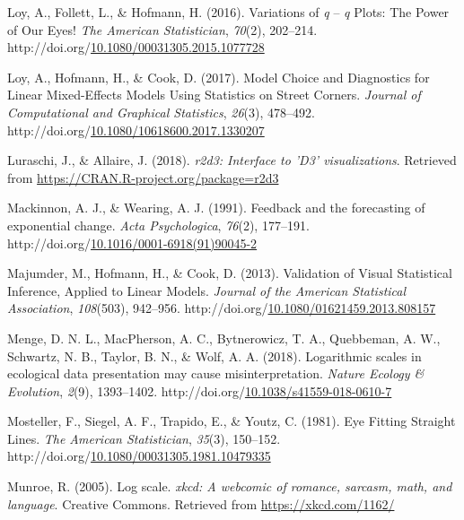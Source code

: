 \documentclass[print]{nuthesis}
\newlength{\cslhangindent}
\newenvironment{CSLReferences}%
{\setlength{\parindent}{0pt}%
\everypar{\setlength{\hangindent}{\cslhangindent}}\ignorespaces}%
{\par}
\begin{document}
\begin{CSLReferences}{1}{0}
\leavevmode\hypertarget{ref-loy_variations_2016}{}%
Loy, A., Follett, L., \& Hofmann, H. (2016). Variations of \emph{q} -- \emph{q} {Plots}: {The} {Power} of {Our} {Eyes}! \emph{The American Statistician}, \emph{70}(2), 202--214. http://doi.org/\href{https://doi.org/10.1080/00031305.2015.1077728}{10.1080/00031305.2015.1077728}

\leavevmode\hypertarget{ref-loy_model_2017}{}%
Loy, A., Hofmann, H., \& Cook, D. (2017). Model {Choice} and {Diagnostics} for {Linear} {Mixed}-{Effects} {Models} {Using} {Statistics} on {Street} {Corners}. \emph{Journal of Computational and Graphical Statistics}, \emph{26}(3), 478--492. http://doi.org/\href{https://doi.org/10.1080/10618600.2017.1330207}{10.1080/10618600.2017.1330207}

\leavevmode\hypertarget{ref-r2d3}{}%
Luraschi, J., \& Allaire, J. (2018). \emph{r2d3: Interface to 'D3' visualizations}. Retrieved from \url{https://CRAN.R-project.org/package=r2d3}

\leavevmode\hypertarget{ref-mackinnon_feedback_1991}{}%
Mackinnon, A. J., \& Wearing, A. J. (1991). Feedback and the forecasting of exponential change. \emph{Acta Psychologica}, \emph{76}(2), 177--191. http://doi.org/\href{https://doi.org/10.1016/0001-6918(91)90045-2}{10.1016/0001-6918(91)90045-2}

\leavevmode\hypertarget{ref-majumder_validation_2013}{}%
Majumder, M., Hofmann, H., \& Cook, D. (2013). Validation of {Visual} {Statistical} {Inference}, {Applied} to {Linear} {Models}. \emph{Journal of the American Statistical Association}, \emph{108}(503), 942--956. http://doi.org/\href{https://doi.org/10.1080/01621459.2013.808157}{10.1080/01621459.2013.808157}

\leavevmode\hypertarget{ref-menge_logarithmic_2018}{}%
Menge, D. N. L., MacPherson, A. C., Bytnerowicz, T. A., Quebbeman, A. W., Schwartz, N. B., Taylor, B. N., \& Wolf, A. A. (2018). Logarithmic scales in ecological data presentation may cause misinterpretation. \emph{Nature Ecology \& Evolution}, \emph{2}(9), 1393--1402. http://doi.org/\href{https://doi.org/10.1038/s41559-018-0610-7}{10.1038/s41559-018-0610-7}

\leavevmode\hypertarget{ref-mosteller_eye_1981}{}%
Mosteller, F., Siegel, A. F., Trapido, E., \& Youtz, C. (1981). Eye {Fitting} {Straight} {Lines}. \emph{The American Statistician}, \emph{35}(3), 150--152. http://doi.org/\href{https://doi.org/10.1080/00031305.1981.10479335}{10.1080/00031305.1981.10479335}

\leavevmode\hypertarget{ref-munroe_2005}{}%
Munroe, R. (2005). Log scale. \emph{xkcd: A webcomic of romance, sarcasm, math, and language}. Creative Commons. Retrieved from \url{https://xkcd.com/1162/}


\end{CSLReferences}
\end{document}
